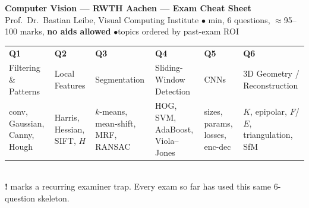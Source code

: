 \documentclass[9pt,a4paper,landscape]{extarticle}
\begin{document}
\begin{center}
{\LARGE\bfseries Computer Vision --- RWTH Aachen --- Exam Cheat Sheet}\\[2pt]
{\footnotesize Prof.\ Dr.\ Bastian Leibe, Visual Computing Institute \quad$\bullet$ min, 6 questions, $\approx$95--100 marks, \textbf{no aids allowed} \quad$\bullet$\quad topics ordered by past-exam ROI}
\end{center}
\vspace{-4pt}

{\footnotesize
\begin{center}
\setlength{\tabcolsep}{4pt}
\begin{tabular}{|l|l|l|l|l|l|}
\hline
\textbf{Q1} & \textbf{Q2} & \textbf{Q3} & \textbf{Q4} & \textbf{Q5} & \textbf{Q6}\\
Filtering \& Patterns & Local Features & Segmentation & Sliding-Window Detection & CNNs & 3D Geometry / Reconstruction\\
conv, Gaussian, Canny, Hough & Harris, Hessian, SIFT, $H$ & $k$-means, mean-shift, MRF, RANSAC & HOG, SVM, AdaBoost, Viola--Jones & sizes, params, losses, enc-dec & $K$, epipolar, $F$/$E$, triangulation, SfM\\
\hline
\end{tabular}\\[2pt]
{\color{trap}\textbf{!}} marks a recurring examiner trap. Every exam so far has used this same 6-question skeleton.
\end{center}}
\vspace{-2pt}
\end{document}
